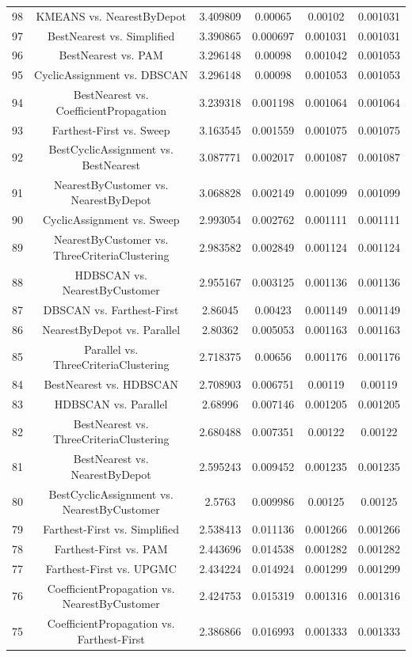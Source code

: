 \documentclass[a4paper,10pt]{article}
\begin{document}
\begin{landscape}
\begin{table}[!htp]
\begin{tabular}{cccccc}
98&KMEANS vs. NearestByDepot&3.409809&0.00065&0.00102&0.001031\\
97&BestNearest vs. Simplified&3.390865&0.000697&0.001031&0.001031\\
96&BestNearest vs. PAM&3.296148&0.00098&0.001042&0.001053\\
95&CyclicAssignment vs. DBSCAN&3.296148&0.00098&0.001053&0.001053\\
94&BestNearest vs. CoefficientPropagation&3.239318&0.001198&0.001064&0.001064\\
93&Farthest-First vs. Sweep&3.163545&0.001559&0.001075&0.001075\\
92&BestCyclicAssignment vs. BestNearest&3.087771&0.002017&0.001087&0.001087\\
91&NearestByCustomer vs. NearestByDepot&3.068828&0.002149&0.001099&0.001099\\
90&CyclicAssignment vs. Sweep&2.993054&0.002762&0.001111&0.001111\\
89&NearestByCustomer vs. ThreeCriteriaClustering&2.983582&0.002849&0.001124&0.001124\\
88&HDBSCAN vs. NearestByCustomer&2.955167&0.003125&0.001136&0.001136\\
87&DBSCAN vs. Farthest-First&2.86045&0.00423&0.001149&0.001149\\
86&NearestByDepot vs. Parallel&2.80362&0.005053&0.001163&0.001163\\
85&Parallel vs. ThreeCriteriaClustering&2.718375&0.00656&0.001176&0.001176\\
84&BestNearest vs. HDBSCAN&2.708903&0.006751&0.00119&0.00119\\
83&HDBSCAN vs. Parallel&2.68996&0.007146&0.001205&0.001205\\
82&BestNearest vs. ThreeCriteriaClustering&2.680488&0.007351&0.00122&0.00122\\
81&BestNearest vs. NearestByDepot&2.595243&0.009452&0.001235&0.001235\\
80&BestCyclicAssignment vs. NearestByCustomer&2.5763&0.009986&0.00125&0.00125\\
79&Farthest-First vs. Simplified&2.538413&0.011136&0.001266&0.001266\\
78&Farthest-First vs. PAM&2.443696&0.014538&0.001282&0.001282\\
77&Farthest-First vs. UPGMC&2.434224&0.014924&0.001299&0.001299\\
76&CoefficientPropagation vs. NearestByCustomer&2.424753&0.015319&0.001316&0.001316\\
75&CoefficientPropagation vs. Farthest-First&2.386866&0.016993&0.001333&0.001333\\

\end{tabular}
\end{table}
\end{landscape}
\end{document}
